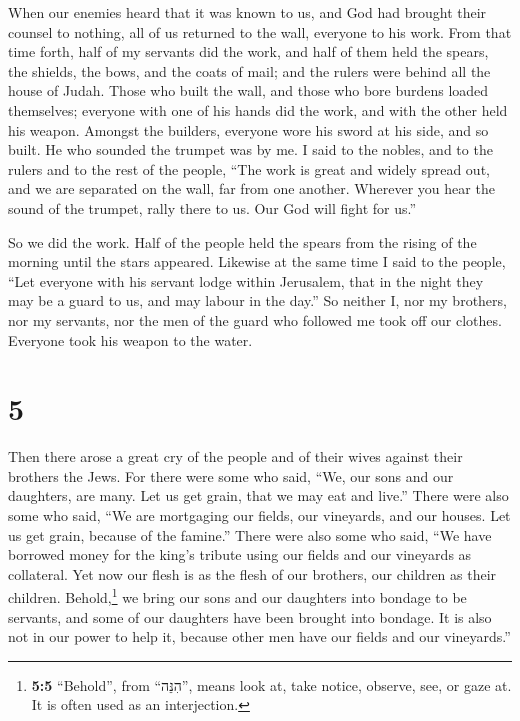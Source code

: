  When our enemies heard that it was known to us, and God
had brought their counsel to nothing, all of us returned to the wall,
everyone to his work.  From that time forth, half of my
servants did the work, and half of them held the spears, the shields,
the bows, and the coats of mail; and the rulers were behind all the
house of Judah.  Those who built the wall, and those who
bore burdens loaded themselves; everyone with one of his hands did the
work, and with the other held his weapon.  Amongst the
builders, everyone wore his sword at his side, and so built. He who
sounded the trumpet was by me.  I said to the nobles, and
to the rulers and to the rest of the people, ``The work is great and
widely spread out, and we are separated on the wall, far from one
another.  Wherever you hear the sound of the trumpet,
rally there to us. Our God will fight for us.''

 So we did the work. Half of the people held the spears
from the rising of the morning until the stars appeared. 
Likewise at the same time I said to the people, ``Let everyone with his
servant lodge within Jerusalem, that in the night they may be a guard to
us, and may labour in the day.''  So neither I, nor my
brothers, nor my servants, nor the men of the guard who followed me took
off our clothes. Everyone took his weapon to the water.

\hypertarget{section-4}{%
\section{5}\label{section-4}}

 Then there arose a great cry of the people and of their
wives against their brothers the Jews.  For there were
some who said, ``We, our sons and our daughters, are many. Let us get
grain, that we may eat and live.''  There were also some
who said, ``We are mortgaging our fields, our vineyards, and our houses.
Let us get grain, because of the famine.''  There were
also some who said, ``We have borrowed money for the king's tribute
using our fields and our vineyards as collateral.  Yet now
our flesh is as the flesh of our brothers, our children as their
children. Behold,\footnote{\textbf{5:5} ``Behold'', from ``הִנֵּה'',
  means look at, take notice, observe, see, or gaze at. It is often used
  as an interjection.} we bring our sons and our daughters into bondage
to be servants, and some of our daughters have been brought into
bondage. It is also not in our power to help it, because other men have
our fields and our vineyards.''

